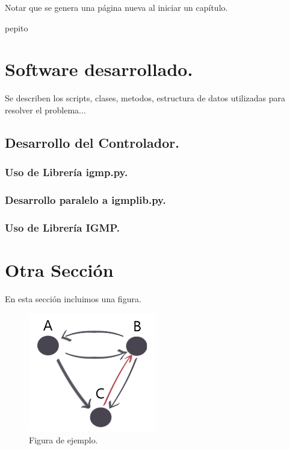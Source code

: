 \documentclass[12pt,a4paper,oneside]{book}
\begin{document}
Notar que se genera una página nueva al iniciar un capítulo.

pepito


\section{Software desarrollado.}

Se describen los scripts, clases, metodos, estructura de datos utilizadas para resolver el problema...

\subsection{Desarrollo del Controlador.}


\subsubsection{Uso de Librería igmp.py.}

\subsubsection{Desarrollo paralelo a igmplib.py.}

\subsubsection{Uso de Librería IGMP.}

\section{Otra Sección}

En esta sección incluimos una figura.
\begin{figure}[ht]
 \centering
 \includegraphics[width=0.5\textwidth]{grafo.png}
 \caption{Figura de ejemplo.}
 \label{fig1}
\end{figure}
\end{document}
